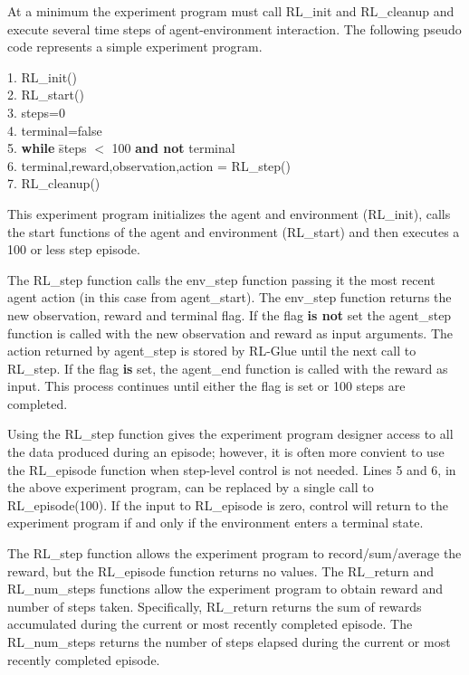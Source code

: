 \documentclass[11pt]{article}
\begin{document}
At a minimum the experiment program must call RL\_init and RL\_cleanup and execute several time steps of agent-environment interaction. The following pseudo code represents a simple experiment program.
\begin{tabbing}
1. RL\_init()\\
2. RL\_start()\\
3. steps=0\\  
4. terminal=false \\
5. {\bf while} \=steps $<$ 100 {\bf and not} terminal\\
6.\> terminal,reward,observation,action = RL\_step()\\
7. RL\_cleanup()
\end{tabbing}
This experiment program initializes the agent and environment (RL\_init), calls the start functions of the agent and environment (RL\_start) and then executes a 100 or less step episode. 

The RL\_step function calls the env\_step function passing it the most recent agent action (in this case from agent\_start). The env\_step function returns the new observation, reward and terminal flag. If the flag {\bf is not} set the agent\_step function is called with the new observation and reward as input arguments. The action returned by agent\_step is stored by RL-Glue until the next call to RL\_step. If the flag {\bf is} set, the agent\_end function is called with the reward as input. This process continues until either the flag is set or 100 steps are completed. 

Using the RL\_step function gives the experiment program designer access to all the data produced during an episode; however, it is often more convient to use the RL\_episode function when step-level control is not needed. Lines 5 and 6, in the above experiment program, can be replaced by a single call to RL\_episode(100). If the input to RL\_episode is zero, control will return to the experiment program if and only if the environment enters a terminal state.

The RL\_step function allows the experiment program to record/sum/average the reward, but the RL\_episode function returns no values. The RL\_return and RL\_num\_steps functions allow the experiment program to obtain reward and number of steps taken. Specifically, RL\_return returns the sum of rewards accumulated during the current or most recently completed episode. The RL\_num\_steps returns the number of steps elapsed during the current or most recently completed episode. 
\end{document}
